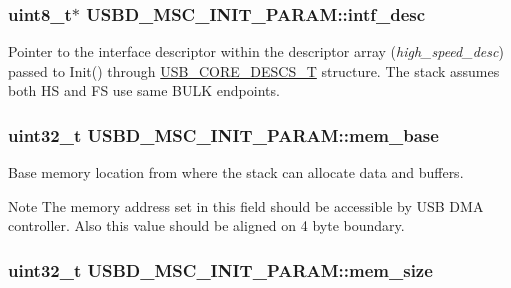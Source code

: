 \hypertarget{structUSBD__MSC__INIT__PARAM_a308fc23cd32876dcdc914d2223f8f7c4}{
\subsubsection[{intf\-\_\-desc}]{\setlength{\rightskip}{0pt plus 5cm}uint8\-\_\-t$\ast$ U\-S\-B\-D\-\_\-\-M\-S\-C\-\_\-\-I\-N\-I\-T\-\_\-\-P\-A\-R\-A\-M\-::intf\-\_\-desc}}\label{structUSBD__MSC__INIT__PARAM_a308fc23cd32876dcdc914d2223f8f7c4}
Pointer to the interface descriptor within the descriptor array ({\itshape high\-\_\-speed\-\_\-desc}) passed to Init() through \hyperlink{group__USBD__Core_gabdc617d119eac0555f91bea957c41ecc}{U\-S\-B\-\_\-\-C\-O\-R\-E\-\_\-\-D\-E\-S\-C\-S\-\_\-\-T} structure. The stack assumes both H\-S and F\-S use same B\-U\-L\-K endpoints. \hypertarget{structUSBD__MSC__INIT__PARAM_a1ab6b66d44ad7db8c2ded5e2f4200aae}{
\subsubsection[{mem\-\_\-base}]{\setlength{\rightskip}{0pt plus 5cm}uint32\-\_\-t U\-S\-B\-D\-\_\-\-M\-S\-C\-\_\-\-I\-N\-I\-T\-\_\-\-P\-A\-R\-A\-M\-::mem\-\_\-base}}\label{structUSBD__MSC__INIT__PARAM_a1ab6b66d44ad7db8c2ded5e2f4200aae}
Base memory location from where the stack can allocate data and buffers. \begin{DoxyNote}{Note}
The memory address set in this field should be accessible by U\-S\-B D\-M\-A controller. Also this value should be aligned on 4 byte boundary. 
\end{DoxyNote}
\hypertarget{structUSBD__MSC__INIT__PARAM_a33048544944f306ae198de18468309b4}{
\subsubsection[{mem\-\_\-size}]{\setlength{\rightskip}{0pt plus 5cm}uint32\-\_\-t U\-S\-B\-D\-\_\-\-M\-S\-C\-\_\-\-I\-N\-I\-T\-\_\-\-P\-A\-R\-A\-M\-::mem\-\_\-size}}\label{structUSBD__MSC__INIT__PARAM_a33048544944f306ae198de18468309b4}
